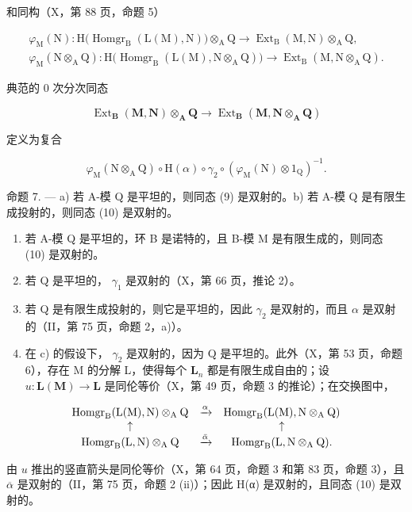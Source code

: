 和同构（X，第 88 页，命题 5）

\[
\begin{array}{c} \varphi_ {\mathrm{M}} (\mathrm{N}): \mathrm{H} \big (\operatorname{Homgr} _ {\mathrm{B}} (\mathrm{L} (\mathrm{M}), \mathrm{N}) \big) \otimes_ {\mathrm{A}} \mathrm{Q} \to \operatorname{Ext} _ {\mathrm{B}} (\mathrm{M}, \mathrm{N}) \otimes_ {\mathrm{A}} \mathrm{Q}, \\ \varphi_ {\mathrm{M}} (\mathrm{N} \otimes_ {\mathrm{A}} \mathrm{Q}): \mathrm{H} \big (\operatorname{Homgr} _ {\mathrm{B}} (\mathrm{L} (\mathrm{M}), \mathrm{N} \otimes_ {\mathrm{A}} \mathrm{Q}) \big) \to \operatorname{Ext} _ {\mathrm{B}} (\mathrm{M}, \mathrm{N} \otimes_ {\mathrm{A}} \mathrm{Q}). \end{array}
\]

典范的 0 次分次同态

\[
\operatorname{Ext} _ {\mathbf {B}} (\mathbf {M}, \mathbf {N}) \otimes_ {\mathbf {A}} \mathbf {Q} \rightarrow \operatorname{Ext} _ {\mathbf {B}} (\mathbf {M}, \mathbf {N} \otimes_ {\mathbf {A}} \mathbf {Q})\tag{10}
\]

定义为复合

\[
\varphi_ {\mathrm{M}} (\mathrm{N} \otimes_ {\mathrm{A}} \mathrm{Q}) \circ \mathrm{H} (\alpha) \circ \gamma_ {2} \circ \left(\varphi_ {\mathrm{M}} (\mathrm{N}) \otimes 1 _ {\mathrm{Q}}\right) ^ {- 1}.
\]

命题 7. --- a) 若 A-模 Q 是平坦的，则同态 (9) 是双射的。b) 若 A-模 Q 是有限生成投射的，则同态 (10) 是双射的。

\begin{enumerate}
\def\labelenumi{\alph{enumi})}
\setcounter{enumi}{2}
\item
  若 A-模 Q 是平坦的，环 B 是诺特的，且 B-模 M 是有限生成的，则同态 (10) 是双射的。
\item
  若 Q 是平坦的， \(\gamma_{1}\) 是双射的（X，第 66 页，推论 2）。
\item
  若 Q 是有限生成投射的，则它是平坦的，因此 \(\gamma_{2}\) 是双射的，而且 \(\alpha\) 是双射的（II，第 75 页，命题 2，a)）。
\item
  在 c) 的假设下， \(\gamma_{2}\) 是双射的，因为 Q 是平坦的。此外（X，第 53 页，命题 6），存在 M 的分解 L，使得每个 \(\mathbf{L}_{n}\) 都是有限生成自由的；设 \(u: \mathbf{L}(\mathbf{M}) \to \mathbf{L}\) 是同伦等价（X，第 49 页，命题 3 的推论）；在交换图中，
\end{enumerate}

\[
\begin{array}{c c c} \operatorname{Homgr} _ {\mathrm{B}} (\mathrm{L} (\mathrm{M}), \mathrm{N}) \otimes_ {\mathrm{A}} \mathrm{Q} & \xrightarrow {\alpha} & \operatorname{Homgr} _ {\mathrm{B}} (\mathrm{L} (\mathrm{M}), \mathrm{N} \otimes_ {\mathrm{A}} \mathrm{Q}) \\ \uparrow & & \uparrow \\ \operatorname{Homgr} _ {\mathrm{B}} (\mathrm{L}, \mathrm{N}) \otimes_ {\mathrm{A}} \mathrm{Q} & \xrightarrow {\bar {\alpha}} & \operatorname{Homgr} _ {\mathrm{B}} (\mathrm{L}, \mathrm{N} \otimes_ {\mathrm{A}} \mathrm{Q}). \end{array}
\]

由 \(u\) 推出的竖直箭头是同伦等价（X，第 64 页，命题 3 和第 83 页，命题 3），且 \(\overline{\alpha}\) 是双射的（II，第 75 页，命题 2 (ii)）；因此 H(α) 是双射的，且同态 (10) 是双射的。

